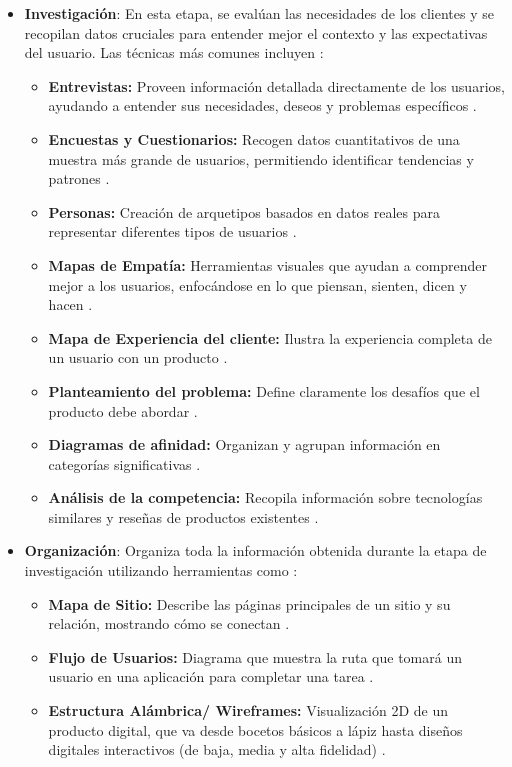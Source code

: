 \begin{itemize}
    \item \textbf{Investigación}: En esta etapa, se evalúan las necesidades de los clientes y se recopilan datos cruciales para entender mejor el contexto y las expectativas del usuario. Las técnicas más comunes incluyen \cite{Leon2013}:
    \begin{itemize}
        \item \textbf{Entrevistas:} Proveen información detallada directamente de los usuarios, ayudando a entender sus necesidades, deseos y problemas específicos \cite{Semi2022}.
        \item \textbf{Encuestas y Cuestionarios:} Recogen datos cuantitativos de una muestra más grande de usuarios, permitiendo identificar tendencias y patrones  \cite{Semi2022}.
        \item \textbf{Personas:} Creación de arquetipos basados en datos reales para representar diferentes tipos de usuarios  \cite{Semi2022}.
        \item \textbf{Mapas de Empatía:} Herramientas visuales que ayudan a comprender mejor a los usuarios, enfocándose en lo que piensan, sienten, dicen y hacen  \cite{Semi2022}.
        \item \textbf{Mapa de Experiencia del cliente:} Ilustra la experiencia completa de un usuario con un producto  \cite{Semi2022}.
        \item \textbf{Planteamiento del problema:} Define claramente los desafíos que el producto debe abordar  \cite{Semi2022}.
        \item \textbf{Diagramas de afinidad:} Organizan y agrupan información en categorías significativas  \cite{Semi2022}.
        \item \textbf{Análisis de la competencia:} Recopila información sobre tecnologías similares y reseñas de productos existentes  \cite{Semi2022}.
    \end{itemize}

    
    \item \textbf{Organización}: Organiza toda la información obtenida durante la etapa de investigación utilizando herramientas como \cite{Leon2013}:
    \begin{itemize}
        \item \textbf{Mapa de Sitio:} Describe las páginas principales de un sitio y su relación, mostrando cómo se conectan  \cite{Semi2022}.
        \item \textbf{Flujo de Usuarios:} Diagrama que muestra la ruta que tomará un usuario en una aplicación para completar una tarea  \cite{Semi2022}.
        \item \textbf{Estructura Alámbrica/ Wireframes:} Visualización 2D de un producto digital, que va desde bocetos básicos a lápiz hasta diseños digitales interactivos (de baja, media y alta fidelidad)  \cite{Semi2022}.
    \end{itemize}
    

\end{itemize}
